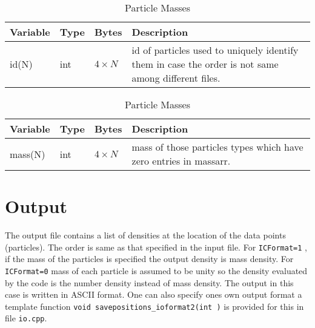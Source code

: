 \documentclass{article}
\begin{document}
\newpage
\begin{table}[here]
  \caption{Particle ID's}
  \begin{tabular}{|p{1.5cm}|p{1.5cm}|p{1.5cm}|p{6cm}|}
\hline
\hline
  Variable     &  Type   &   Bytes & Description\\
\hline
id(N) & int & $4 \times N$ & id of particles used to uniquely identify
them in  case the order is not same among different files. \\
\hline
\end{tabular}
\caption{Particle Masses}
\begin{tabular}{|p{1.5cm}|p{1.5cm}|p{1.5cm}|p{6cm}|}
\hline
\hline
  Variable     &  Type   &   Bytes & Description\\
\hline
mass(N) & int & $4 \times N$ & mass of those particles types which
have zero entries in massarr.\\
\hline
\end{tabular}
\end{table}


\section{Output}
The output file contains a list of densities at the location 
of the data points (particles). The order is same as that 
specified in the input file. For \verb$ICFormat=1$ ,
if the mass of the particles is specified the output 
density is mass density.
For \verb$ICFormat=0$ mass of each particle is assumed
to be unity so the density evaluated by the code 
is the number density instead of mass density.
The output in this case is written in ASCII  format.
One can also specify ones own output format a template function 
\verb$void savepositions_ioformat2(int )$ is provided for this in file
\verb$io.cpp$.

\setcounter{table}{0} 
\end{document}
